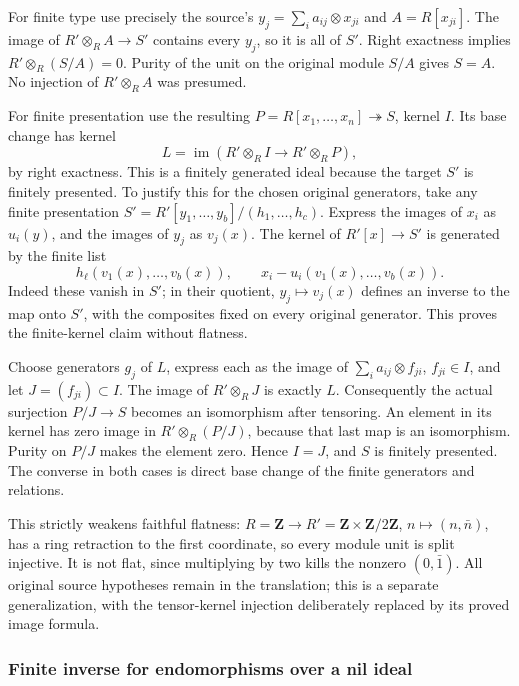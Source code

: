 For finite type use precisely the source's \(y_j=\sum_i a_{ij}\otimes x_{ji}\) and \(A=R[x_{ji}]\). The image of \(R'\otimes_R A\to S'\) contains every \(y_j\), so it is all of \(S'\). Right exactness implies \(R'\otimes_R(S/A)=0\). Purity of the unit on the original module \(S/A\) gives \(S=A\). No injection of \(R'\otimes_R A\) was presumed.

For finite presentation use the resulting \(P=R[x_1,\ldots,x_n]\twoheadrightarrow S\), kernel \(I\). Its base change has kernel \[
L=\operatorname{im}(R'\otimes_R I\to R'\otimes_R P),
\] by right exactness. This is a finitely generated ideal because the target \(S'\) is finitely presented. To justify this for the chosen original generators, take any finite presentation \(S'=R'[y_1,\ldots,y_b]/(h_1,\ldots,h_c)\). Express the images of \(x_i\) as \(u_i(y)\), and the images of \(y_j\) as \(v_j(x)\). The kernel of \(R'[x]\to S'\) is generated by the finite list \[
h_\ell(v_1(x),\ldots,v_b(x)),\qquad x_i-u_i(v_1(x),\ldots,v_b(x)).
\] Indeed these vanish in \(S'\); in their quotient, \(y_j\mapsto v_j(x)\) defines an inverse to the map onto \(S'\), with the composites fixed on every original generator. This proves the finite-kernel claim without flatness.

Choose generators \(g_j\) of \(L\), express each as the image of \(\sum_i a_{ij}\otimes f_{ji}\), \(f_{ji}\in I\), and let \(J=(f_{ji})\subset I\). The image of \(R'\otimes_R J\) is exactly \(L\). Consequently the actual surjection \(P/J\to S\) becomes an isomorphism after tensoring. An element in its kernel has zero image in \(R'\otimes_R(P/J)\), because that last map is an isomorphism. Purity on \(P/J\) makes the element zero. Hence \(I=J\), and \(S\) is finitely presented. The converse in both cases is direct base change of the finite generators and relations.

This strictly weakens faithful flatness: \(R=\mathbf Z\to R'=\mathbf Z\times\mathbf Z/2\mathbf Z\), \(n\mapsto(n,\bar n)\), has a ring retraction to the first coordinate, so every module unit is split injective. It is not flat, since multiplying by two kills the nonzero \((0,\bar1)\). All original source hypotheses remain in the translation; this is a separate generalization, with the tensor-kernel injection deliberately replaced by its proved image formula.

\subsubsection{Finite inverse for endomorphisms over a nil ideal}\label{algebra-proof-035-finite-inverse-for-endomorphisms-over-a-nil-ideal}

